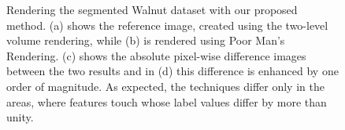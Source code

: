 \documentclass{egpubl}
\begin{document}
\begin{figure}[p]
\begin{minipage}{0.22\linewidth}
{		\label{fig:result2:diff}
	}
\end{minipage}
	\caption{Rendering the segmented Walnut dataset with our proposed method. (a) shows the reference image, created using the two-level volume rendering, while (b) is rendered using Poor Man's Rendering. (c) shows the absolute pixel-wise difference images between the two results and in (d) this difference is enhanced by one order of magnitude. As expected, the techniques differ only in the areas, where features touch whose label values differ by more than unity.}
	\label{fig:result2}
\end{figure}
\end{document}
